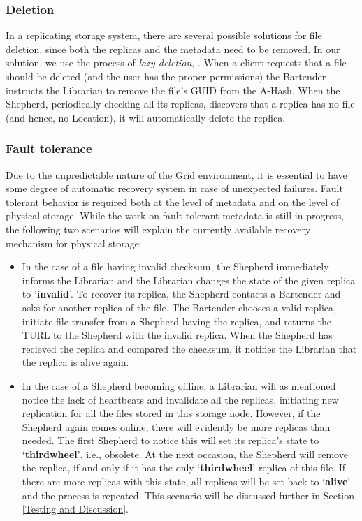 \documentclass[final]{ieee}
\begin{document}
\subsubsection{Deletion}
\label{Deletion}
In a replicating storage system, there are several possible solutions
for file deletion, since both the replicas and the metadata need to be
removed. In our solution, we use the process of \textit{lazy
  deletion}, \cite{LazyDeletion}. When a client requests that a file
should be deleted (and the user has the proper permissions) the
Bartender instructs the Librarian to remove the file's GUID from the
A-Hash. When the Shepherd, periodically checking all its replicas,
discovers that a replica has no file (and hence, no Location), it will
automatically delete the replica.

\subsubsection{Fault tolerance}
\label{Fault tolerance}

Due to the unpredictable nature of the Grid environment, it is essential to
have some degree of  automatic recovery system in case of unexpected
failures. Fault tolerant behavior is required both at the level of
metadata and on the level of physical storage. While the work on fault-tolerant metadata is still in
progress, the following two
scenarios will explain the currently available recovery mechanism for
physical storage: 
\begin{itemize}
\item In the case of a file having invalid checksum, the Shepherd
immediately informs the Librarian and the Librarian changes the state of the given replica to
`\textbf{invalid}'. To recover its replica, the Shepherd contacts a
Bartender and asks for another replica of the file. The Bartender chooses a valid
replica, initiate file transfer from a Shepherd having the replica,
and returns the TURL to the Shepherd with the invalid replica. When the
Shepherd has recieved the replica and compared the checksum, it notifies the
Librarian that the replica is alive again.  
\item In the case of a Shepherd becoming offline, a Librarian will
  as mentioned notice the lack of heartbeats and invalidate all the
  replicas, initiating new replication for all the files stored in
  this storage node. However, if the Shepherd
  again comes online, there will evidently be more replicas than
  needed. The first Shepherd to notice this will set its replica's
  state to `\textbf{thirdwheel}', i.e., obsolete. At the next occasion,
  the Shepherd will remove the replica, if and only if it has the only
  `\textbf{thirdwheel}' replica of this file. If there are more
  replicas with this state, all replicas will be set back to
  `\textbf{alive}' and the process is repeated. This scenario will be discussed further in Section
  \ref{Testing and Discussion}.
\end{itemize}
\end{document}
